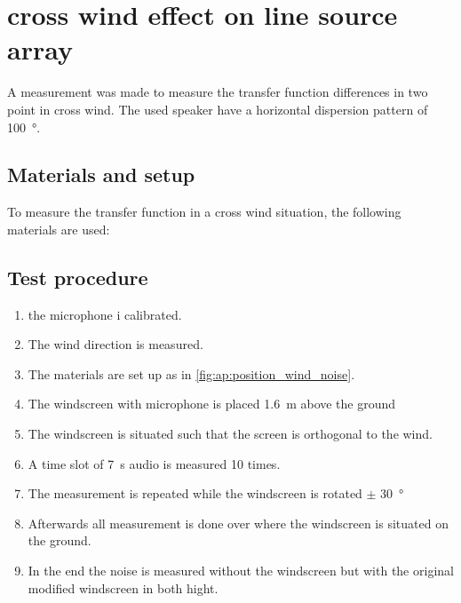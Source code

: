 \chapter{cross wind effect on line source array}\label{ch:ap:measurement_one}
A measurement was made to measure the transfer function differences in two point in cross wind. The used speaker have a horizontal dispersion pattern of \SI{100}{\degree}. 


\section*{Materials and setup}
To measure the transfer function in a cross wind situation, the following materials are used:

\startequipment
{}
\stopequipment







\section*{Test procedure}


\begin{enumerate}
\item the microphone i calibrated.
\item The wind direction is measured.
\item The materials are set up as in \autoref{fig:ap:position_wind_noise}.
\item The windscreen with microphone is placed \SI{1.6}{\meter} above the ground
\item The windscreen is situated such that the screen is orthogonal to the wind.
\item A time slot of \SI{7}{\second} audio is measured 10 times.
\item The measurement is repeated while the windscreen is rotated $\pm$ \SI{30}{\degree}
\item Afterwards all measurement is done over where the windscreen is situated on the ground.
\item In the end the noise is measured without the windscreen but with the original modified windscreen in both hight. 
\end{enumerate}


